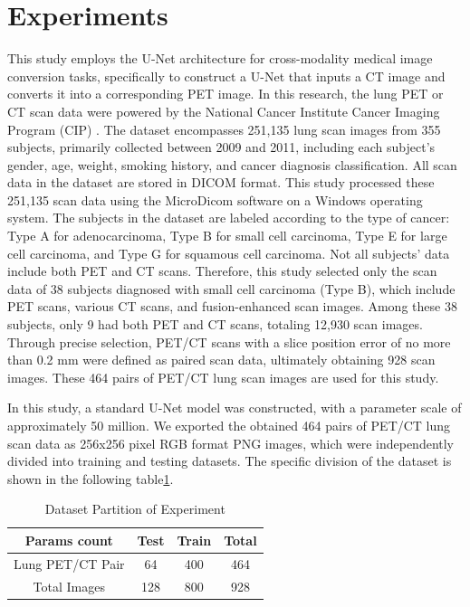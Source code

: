 \documentclass[twocolumn]{article}
\begin{document}
\section{Experiments}
This study employs the U-Net architecture for cross-modality medical image conversion tasks, specifically to construct a U-Net that inputs a CT image and converts it into a corresponding PET image. In this research, the lung PET or CT scan data were powered by the National Cancer Institute Cancer Imaging Program (CIP) \cite{li_large-scale_2020}. The dataset encompasses 251,135 lung scan images from 355 subjects, primarily collected between 2009 and 2011, including each subject's gender, age, weight, smoking history, and cancer diagnosis classification. All scan data in the dataset are stored in DICOM format. This study processed these 251,135 scan data using the MicroDicom software on a Windows operating system. The subjects in the dataset are labeled according to the type of cancer: Type A for adenocarcinoma, Type B for small cell carcinoma, Type E for large cell carcinoma, and Type G for squamous cell carcinoma. Not all subjects' data include both PET and CT scans. Therefore, this study selected only the scan data of 38 subjects diagnosed with small cell carcinoma (Type B), which include PET scans, various CT scans, and fusion-enhanced scan images. Among these 38 subjects, only 9 had both PET and CT scans, totaling 12,930 scan images. Through precise selection, PET/CT scans with a slice position error of no more than 0.2 mm were defined as paired scan data, ultimately obtaining 928 scan images. These 464 pairs of PET/CT lung scan images are used for this study.

In this study, a standard U-Net model was constructed, with a parameter scale of approximately 50 million. We exported the obtained 464 pairs of PET/CT lung scan data as 256x256 pixel RGB format PNG images, which were independently divided into training and testing datasets. The specific division of the dataset is shown in the following table\ref{tab:dataset_partition_1}.

\begin{table}[h]
	\centering
	\caption{Dataset Partition of Experiment}
	\label{tab:dataset_partition_1}
	\begin{tabular}{cccc}
		\toprule
		Params count     & Test & Train & Total \\
		\midrule
		Lung PET/CT Pair & 64   & 400   & 464   \\
		Total Images     & 128  & 800   & 928   \\
		\bottomrule
	\end{tabular}
\end{table}
\end{document}
